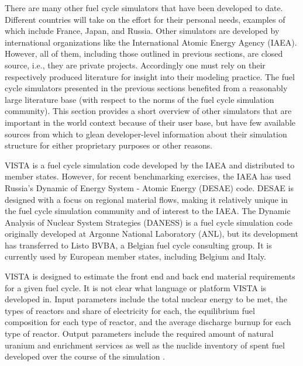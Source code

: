 There are many other fuel cycle simulators that have been developed to
date. Different countries will take on the effort for their personal needs,
examples of which include France, Japan, and Russia. Other simulators are
developed by international organizations like the International Atomic Energy
Agency (IAEA). However, all of them, including those outlined in previous
sections, are closed source, i.e., they are private projects. Accordingly one
must rely on their respectively produced literature for insight into their
modeling practice. The fuel cycle simulators presented in the previous sections
benefited from a reasonably large literature base (with respect to the norms of
the fuel cycle simulation community). This section provides a short overview of
other simulators that are important in the world context because of their user
base, but have few available sources from which to glean developer-level
information about their simulation structure for either proprietary purposes or
other reasons. 

VISTA is a fuel cycle simulation code developed by the IAEA and distributed to
member states. However, for recent benchmarking exercises, the IAEA has used
Russia's Dynamic of Energy System - Atomic Energy (DESAE) code. DESAE is
designed with a focus on regional material flows, making it relatively unique in
the fuel cycle simulation community and of interest to the IAEA. The Dynamic
Analysis of Nuclear System Strategies (DANESS) is a fuel cycle simulation code
originally developed at Argonne National Laboratory (ANL), but its development
has transferred to Listo BVBA, a Belgian fuel cycle consulting group. It is
currently used by European member states, including Belgium and Italy.

VISTA is designed to estimate the front end and back end material requirements
for a given fuel cycle. It is not clear what language or platform VISTA is
developed in. Input parameters include the total nuclear energy to be met, the
types of reactors and share of electricity for each, the equilibrium fuel
composition for each type of reactor, and the average discharge burnup for each
type of reactor. Output parameters include the required amount of natural
uranium and enrichment services as well as the nuclide inventory of spent fuel
developed over the course of the simulation \cite{iaea_nuclear_2007}.

